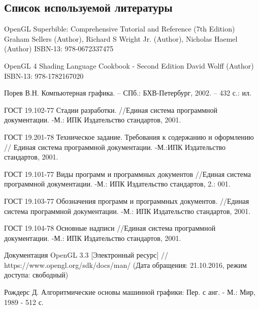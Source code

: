 \subsection{Список используемой литературы}
\begin{my_enumerate}
\item
OpenGL Superbible: Comprehensive Tutorial and Reference (7th Edition)
Graham Sellers (Author), Richard S Wright Jr. (Author), Nicholas Haemel (Author)
ISBN-13: 978-0672337475

\item
OpenGL 4 Shading Language Cookbook - Second Edition
David Wolff (Author)
ISBN-13: 978-1782167020

\item
Порев В.Н. Компьютерная графика. – СПб.: БХВ-Петербург, 2002. – 432 с.: ил.

\item
ГОСТ 19.102-77 Стадии разработки. //Единая система программной документации. -М.: ИПК Издательство стандартов, 2001.

\item
ГОСТ 19.201-78 Техническое задание. Требования к содержанию и оформлению // Единая система программной документации. -М.:ИПК Издательство стандартов, 2001.

\item
ГОСТ 19.101-77 Виды программ и программных документов
//Единая система программной документации. -М.: ИПК Издательство стандартов, 2.: 001.

\item
ГОСТ 19.103-77 Обозначения программ и программных документов. //Единая система программной документации. -М.: ИПК Издательство стандартов, 2001.

\item
 ГОСТ 19.104-78 Основные надписи //Единая система программной документации. -М.: ИПК Издательство стандартов, 2001.

\item
Документация OpenGL 3.3 [Электронный ресурс] // https://www.opengl.org/sdk/docs/man/ (Дата обращения: 21.10.2016, режим доступа: свободный)

\item
Рождерс Д. Алгоритмические основы машинной графики: Пер. с анг. - М.: Мир, 1989 - 512 с.

\end{my_enumerate}

